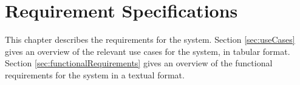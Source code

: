 \chapter{Requirement Specifications}
\label{chap:requrementSpecifications}
This chapter describes the requirements for the system. Section \ref{sec:useCases} gives
an overview of the relevant use cases for the system, in tabular format. Section \ref{sec:functionalRequirements}
gives an overview of the functional requirements for the system in a textual format.


